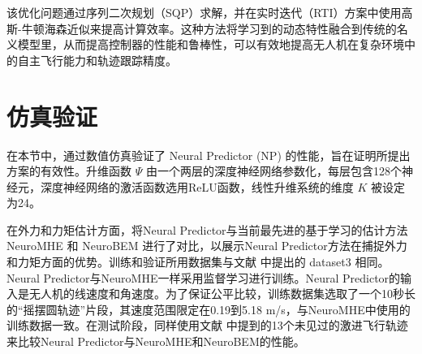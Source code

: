 \documentclass[lang=chs, degree=master, blindreview=true, winfonts=true]{yanputhesis}
\begin{document}
该优化问题通过序列二次规划（SQP）求解，并在实时迭代（RTI）方案中使用高斯-牛顿海森近似来提高计算效率。这种方法将学习到的动态特性融合到传统的名义模型里，从而提高控制器的性能和鲁棒性，可以有效地提高无人机在复杂环境中的自主飞行能力和轨迹跟踪精度。

\section{仿真验证}


在本节中，通过数值仿真验证了 Neural Predictor   (NP) 的性能，旨在证明所提出方案的有效性。升维函数 $\Psi$ 由一个两层的深度神经网络参数化，每层包含128个神经元，深度神经网络的激活函数选用ReLU函数，线性升维系统的维度 $K$ 被设定为24。

在外力和力矩估计方面，将Neural Predictor与当前最先进的基于学习的估计方法NeuroMHE \cite{Wang2024e} 和 NeuroBEM \cite{Bauersfeld2021} 进行了对比，以展示Neural Predictor方法在捕捉外力和力矩方面的优势。训练和验证所用数据集与文献  中提出的 dataset3 相同。Neural Predictor与NeuroMHE一样采用监督学习进行训练。Neural Predictor的输入是无人机的线速度和角速度。为了保证公平比较，训练数据集选取了一个10秒长的“摇摆圆轨迹”片段，其速度范围限定在0.19到5.18 m/s，与NeuroMHE中使用的训练数据一致。在测试阶段，同样使用文献  中提到的13个未见过的激进飞行轨迹来比较Neural Predictor与NeuroMHE和NeuroBEM的性能。
\end{document}
